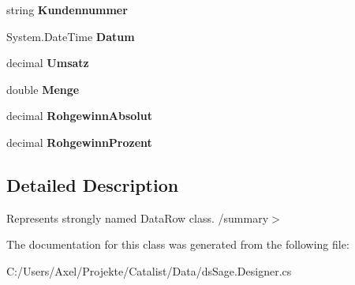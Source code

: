 \begin{DoxyCompactItemize}
\item 
string {\bfseries Kundennummer}\hypertarget{class_products_1_1_data_1_1ds_sage_1_1_kundenumsatz_row_aa40b53bcd4d5a951701f6e542fd8b5c4}{}\label{class_products_1_1_data_1_1ds_sage_1_1_kundenumsatz_row_aa40b53bcd4d5a951701f6e542fd8b5c4}

\item 
System.\+Date\+Time {\bfseries Datum}\hypertarget{class_products_1_1_data_1_1ds_sage_1_1_kundenumsatz_row_a8b50503f2a074bf3abe373969a73e6c1}{}\label{class_products_1_1_data_1_1ds_sage_1_1_kundenumsatz_row_a8b50503f2a074bf3abe373969a73e6c1}

\item 
decimal {\bfseries Umsatz}\hypertarget{class_products_1_1_data_1_1ds_sage_1_1_kundenumsatz_row_afeec6bcb5b7053d715db6bd4f2df5048}{}\label{class_products_1_1_data_1_1ds_sage_1_1_kundenumsatz_row_afeec6bcb5b7053d715db6bd4f2df5048}

\item 
double {\bfseries Menge}\hypertarget{class_products_1_1_data_1_1ds_sage_1_1_kundenumsatz_row_a412e1ad0d609df4df339fd85574d0d02}{}\label{class_products_1_1_data_1_1ds_sage_1_1_kundenumsatz_row_a412e1ad0d609df4df339fd85574d0d02}

\item 
decimal {\bfseries Rohgewinn\+Absolut}\hypertarget{class_products_1_1_data_1_1ds_sage_1_1_kundenumsatz_row_a640a4370d0e0d072e8b948dddd2038a1}{}\label{class_products_1_1_data_1_1ds_sage_1_1_kundenumsatz_row_a640a4370d0e0d072e8b948dddd2038a1}

\item 
decimal {\bfseries Rohgewinn\+Prozent}\hypertarget{class_products_1_1_data_1_1ds_sage_1_1_kundenumsatz_row_a2696a19223c0b1e4677b2a7100ba2f14}{}\label{class_products_1_1_data_1_1ds_sage_1_1_kundenumsatz_row_a2696a19223c0b1e4677b2a7100ba2f14}

\end{DoxyCompactItemize}


\subsection{Detailed Description}
Represents strongly named Data\+Row class. /summary$>$ 

The documentation for this class was generated from the following file\+:\begin{DoxyCompactItemize}
\item 
C\+:/\+Users/\+Axel/\+Projekte/\+Catalist/\+Data/ds\+Sage.\+Designer.\+cs\end{DoxyCompactItemize}
